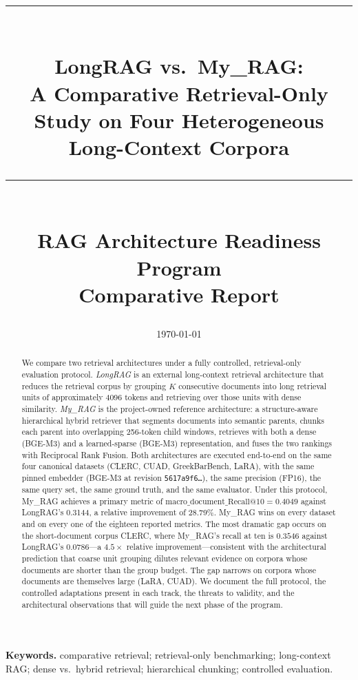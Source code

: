 \documentclass[11pt,a4paper]{article}
\title{
  \vspace{-1.5cm}
  \rule{\linewidth}{0.4pt}\\[0.3cm]
  {\Large\bfseries LongRAG vs.\ My\_RAG:}\\[0.15cm]
  {\large A Comparative Retrieval-Only Study on Four Heterogeneous\\ Long-Context Corpora}\\[0.2cm]
  \rule{\linewidth}{0.4pt}\\[0.4cm]
  \normalsize RAG Architecture Readiness Program\\
  \small Comparative Report
}
\author{}
\date{\today}
\begin{document}
\maketitle
\thispagestyle{empty}

\begin{abstract}
\noindent
We compare two retrieval architectures under a fully controlled,
retrieval-only evaluation protocol. \emph{LongRAG} is an external
long-context retrieval architecture that reduces the retrieval corpus
by grouping $K$ consecutive documents into long retrieval units of
approximately \SI{4096}{} tokens and retrieving over those units with
dense similarity. \emph{My\_RAG} is the project-owned reference
architecture: a structure-aware hierarchical hybrid retriever that
segments documents into semantic parents, chunks each parent into
overlapping \SI{256}{}-token child windows, retrieves with both a
dense (BGE-M3) and a learned-sparse (BGE-M3) representation, and
fuses the two rankings with Reciprocal Rank Fusion. Both
architectures are executed end-to-end on the same four canonical
datasets (CLERC, CUAD, GreekBarBench, LaRA), with the same pinned
embedder (BGE-M3 at revision \texttt{5617a9f6\dots}), the same
precision (FP16), the same query set, the same ground truth, and the
same evaluator. Under this protocol, My\_RAG achieves a primary
metric of $\mathrm{macro\_document\_Recall@10} = \num{0.4049}$
against LongRAG's \num{0.3144}, a relative improvement of
\num{28.79}\%. My\_RAG wins on every dataset and on every one of the
eighteen reported metrics. The most dramatic gap occurs on the
short-document corpus CLERC, where My\_RAG's recall at ten is
$\num{0.3546}$ against LongRAG's $\num{0.0786}$---a $4.5\times$
relative improvement---consistent with the architectural prediction
that coarse unit grouping dilutes relevant evidence on corpora whose
documents are shorter than the group budget. The gap narrows on
corpora whose documents are themselves large (LaRA, CUAD). We
document the full protocol, the controlled adaptations present in
each track, the threats to validity, and the architectural
observations that will guide the next phase of the program.
\end{abstract}

\vfill
\noindent\textbf{Keywords.} comparative retrieval; retrieval-only
benchmarking; long-context RAG; dense vs.\ hybrid retrieval;
hierarchical chunking; controlled evaluation.

\newpage
\tableofcontents
\newpage
\end{document}
